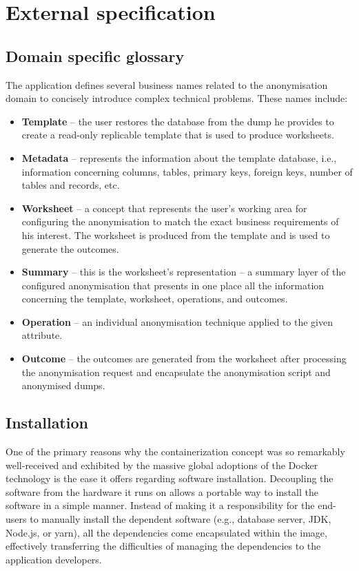 \documentclass[a4paper,twoside,12pt]{book}
\begin{document}
\chapter{External specification}

\section{Domain specific glossary}

The application defines several business names related to the anonymisation domain to concisely introduce complex technical problems. These names include:
\begin{itemize}
\item \textbf{Template} – the user restores the database from the dump he provides to create a read-only replicable template that is used to produce worksheets.
\item \textbf{Metadata} – represents the information about the template database, i.e., information concerning columns, tables, primary keys, foreign keys, number of tables and records, etc.
\item \textbf{Worksheet} – a concept that represents the user's working area for configuring the anonymisation to match the exact business requirements of his interest. The worksheet is produced from the template and is used to generate the outcomes.
\item \textbf{Summary} – this is the worksheet's representation – a summary layer of the configured anonymisation that presents in one place all the information concerning the template, worksheet, operations, and outcomes.
\item \textbf{Operation} – an individual anonymisation technique applied to the given attribute.
\item \textbf{Outcome} – the outcomes are generated from the worksheet after processing the anonymisation request and encapsulate the anonymisation script and anonymised dumps.
\end{itemize}

\section{Installation}

One of the primary reasons why the containerization concept was so remarkably well-received \cite{bib:stackoverflow2021} and exhibited by the massive global adoptions of the Docker technology is the ease it offers regarding software installation. Decoupling the software from the hardware it runs on allows a portable way to install the software in a simple manner. Instead of making it a responsibility for the end-users to manually install the dependent software (e.g., database server, JDK, Node.js, or yarn), all the dependencies come encapsulated within the image, effectively transferring the difficulties of managing the dependencies to the application developers.
\end{document}

